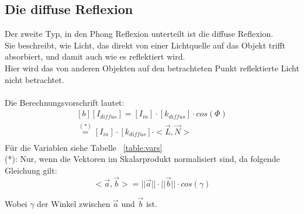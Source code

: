 \documentclass[a4paper]{scrartcl}%
\begin{document}
    \subsection{Die diffuse Reflexion}%
    \label{sub:die_diffuse_reflexion}
        Der zweite Typ, in den Phong Reflexion unterteilt ist die diffuse Reflexion.\\
        Sie beschreibt, wie Licht, das direkt von einer Lichtquelle auf das Objekt trifft absorbiert, und damit auch wie es reflektiert wird.\\
        Hier wird das von anderen Objekten auf den betrachteten Punkt reflektierte Licht nicht betrachtet.\\
        \\Die Berechnungsvorschrift lautet:\\
        \begin{equation}
            \label{eq:diff}
            \begin{multlined}[b]
                [I_{diffus}] = [I_{in}] \cdot [k_{diffus}] \cdot cos(\Phi)\\
                \overset{(*)}{=} [I_{in}] \cdot [k_{diffus}] \cdot <\vec{L}, \vec{N}>\\
            \end{multlined} 
        \end{equation}
        Für die Variablen siehe Tabelle ~\ref{table:vars}\\

        (*): Nur, wenn die Vektoren im Skalarprodukt normalisiert sind, da folgende Gleichung gilt:\\
        \begin{equation}
            \label{eq:dot-prod}
            <\vec{a}, \vec{b}> = ||\vec{a}|| \cdot ||\vec{b}|| \cdot cos(\gamma)
        \end{equation}
        \centerline{Wobei $\gamma$ der Winkel zwischen $\vec{a}$ und $\vec{b}$ ist.}\\
        
\end{document}
